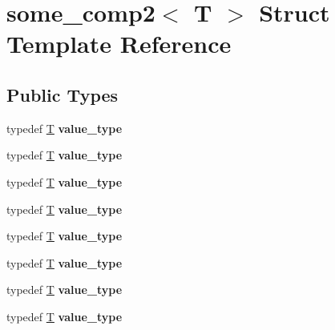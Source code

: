 \hypertarget{structsome__comp2}{}\section{some\+\_\+comp2$<$ T $>$ Struct Template Reference}
\label{structsome__comp2}
\subsection*{Public Types}
\begin{DoxyCompactItemize}
\item 
\mbox{\label{structsome__comp2_a79b3e057c763b7b9a66dc40bc9a7938e}} 
typedef \mbox{\hyperlink{struct_t}{T}} {\bfseries value\+\_\+type}
\item 
\mbox{\label{structsome__comp2_a79b3e057c763b7b9a66dc40bc9a7938e}} 
typedef \mbox{\hyperlink{struct_t}{T}} {\bfseries value\+\_\+type}
\item 
\mbox{\label{structsome__comp2_a79b3e057c763b7b9a66dc40bc9a7938e}} 
typedef \mbox{\hyperlink{struct_t}{T}} {\bfseries value\+\_\+type}
\item 
\mbox{\label{structsome__comp2_a79b3e057c763b7b9a66dc40bc9a7938e}} 
typedef \mbox{\hyperlink{struct_t}{T}} {\bfseries value\+\_\+type}
\item 
\mbox{\label{structsome__comp2_a79b3e057c763b7b9a66dc40bc9a7938e}} 
typedef \mbox{\hyperlink{struct_t}{T}} {\bfseries value\+\_\+type}
\item 
\mbox{\label{structsome__comp2_a79b3e057c763b7b9a66dc40bc9a7938e}} 
typedef \mbox{\hyperlink{struct_t}{T}} {\bfseries value\+\_\+type}
\item 
\mbox{\label{structsome__comp2_a79b3e057c763b7b9a66dc40bc9a7938e}} 
typedef \mbox{\hyperlink{struct_t}{T}} {\bfseries value\+\_\+type}
\item 
\mbox{\label{structsome__comp2_a79b3e057c763b7b9a66dc40bc9a7938e}} 
typedef \mbox{\hyperlink{struct_t}{T}} {\bfseries value\+\_\+type}
\end{DoxyCompactItemize}
